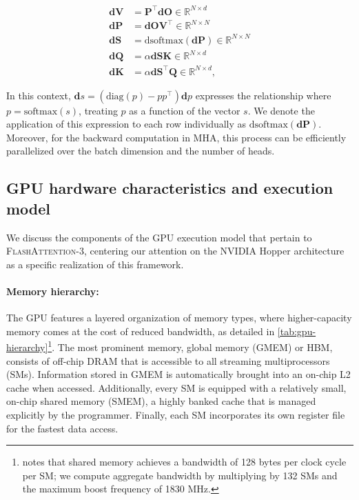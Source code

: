 \begin{enumerate}
\begin{align*}
  \mathbf{dV} &= \mathbf{P}^\top \mathbf{dO} \in \mathbb{R}^{N \times d} \\
  \mathbf{dP} &= \mathbf{dO} \mathbf{V}^\top \in \mathbb{R}^{N \times N} \\
  \mathbf{dS} &= \mathrm{dsoftmax} (\mathbf{dP}) \in \mathbb{R}^{N \times N} \\
  \mathbf{dQ} &= \alpha \mathbf{dS} \mathbf{K} \in \mathbb{R}^{N \times d} \\
  \mathbf{dK} &= \alpha \mathbf{dS}^\top \mathbf{Q} \in \mathbb{R}^{N \times d},
\end{align*}

In this context, $\mathbf{d}s = (\mathrm{diag}(p) - p p^\top)\mathbf{d}p$ expresses the relationship where $p = \mathrm{softmax}(s)$, treating $p$ as a function of the vector $s$. We denote the application of this expression to each row individually as $\mathrm{dsoftmax}(\mathbf{dP})$. Moreover, for the backward computation in MHA, this process can be efficiently parallelized over the batch dimension and the number of heads.

\subsection{GPU hardware characteristics and execution model}
\label{subsec:hardware}

We discuss the components of the GPU execution model that pertain to \textsc{FlashAttention-3}, centering our attention on the NVIDIA Hopper architecture as a specific realization of this framework.

\paragraph{Memory hierarchy:} The GPU features a layered organization of memory types, where higher-capacity memory comes at the cost of reduced bandwidth, as detailed in \cref{tab:gpu-hierarchy}\footnote{\citet{luo2024benchmarking} notes that shared memory achieves a bandwidth of 128 bytes per clock cycle per SM; we compute aggregate bandwidth by multiplying by 132 SMs and the maximum boost frequency of 1830 MHz.}. The most prominent memory, global memory (GMEM) or HBM, consists of off-chip DRAM that is accessible to all streaming multiprocessors (SMs). Information stored in GMEM is automatically brought into an on-chip L2 cache when accessed. Additionally, every SM is equipped with a relatively small, on-chip shared memory (SMEM), a highly banked cache that is managed explicitly by the programmer. Finally, each SM incorporates its own register file for the fastest data access.


\end{enumerate}
